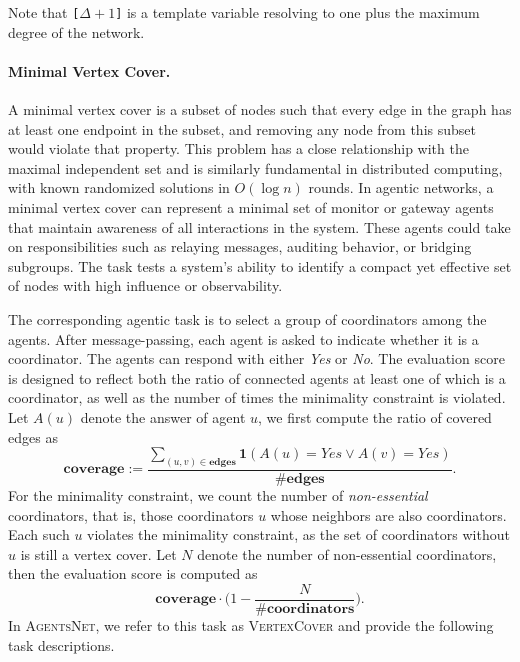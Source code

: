 \documentclass{article}
\newcommand{\benchmark}{\textsc{AgentsNet}}
\begin{document}
Note that \texttt{[$\Delta + 1$]} is a template variable resolving to one plus the maximum degree of the network.

\paragraph{Minimal Vertex Cover.} A minimal vertex cover is a subset of nodes such that every edge in the graph has at least one endpoint in the subset, and removing any node from this subset would violate that property. This problem has a close relationship with the maximal independent set and is similarly fundamental in distributed computing, with known randomized solutions in $O(\log n)$ rounds.
In agentic networks, a minimal vertex cover can represent a minimal set of monitor or gateway agents that maintain awareness of all interactions in the system. These agents could take on responsibilities such as relaying messages, auditing behavior, or bridging subgroups. The task tests a system's ability to identify a compact yet effective set of nodes with high influence or observability. 


The corresponding agentic task is to select a group of coordinators among the agents. After message-passing, each agent is asked to indicate whether it is a coordinator. The agents can respond with either \textit{Yes} or \textit{No}. The evaluation score is designed to reflect both the ratio of connected agents at least one of which is a coordinator, as well as the number of times the minimality constraint is violated. Let $A(u)$ denote the answer of agent $u$, we first compute the ratio of covered edges as
\begin{equation*}
    \textbf{coverage} := \dfrac{\sum_{(u, v) \in \textbf{edges}} \mathbf{1}(A(u) = \textit{Yes} \vee A(v) = \textit{Yes})}{\#\textbf{edges}}.
\end{equation*}
For the minimality constraint, we count the number of \textit{non-essential} coordinators, that is, those coordinators $u$ whose neighbors are also coordinators. Each such $u$ violates the minimality constraint, as the set of coordinators without $u$ is still a vertex cover. Let $N$ denote the number of non-essential coordinators, then the evaluation score is computed as
\begin{equation*}
    \textbf{coverage} \cdot \Big(1 - \frac{N}{\#\textbf{coordinators}}\Big).
\end{equation*}
In \benchmark{}, we refer to this task as \textsc{VertexCover} and provide the following task descriptions.
\end{document}

